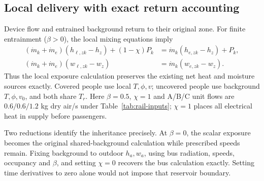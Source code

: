 \subsection{Local delivery with exact return accounting}
Device flow and entrained background return to their original zone. For finite entrainment ($\beta>0$), the local mixing equations imply
\begin{align}
 (\dot m_k+\dot m_e)(h_{\ell,zk}-h_z)+(1-\chi)P_k
 &=\dot m_k(h_{e,zk}-h_z)+P_k,\\
 (\dot m_k+\dot m_e)(w_{\ell,zk}-w_z)
 &=\dot m_k(w_{e,zk}-w_z).
\label{eq:return-closure}
\end{align}
Thus the local exposure calculation preserves the existing net heat and moisture sources exactly. Covered people use local $T,\phi,v$; uncovered people use background $T,\phi,v_0$, and both share $T_r$. Here $\beta=0.5$, $\chi=1$ and A/B/C unit flows are $0.6/0.6/1.2$ kg dry air/s under Table~\ref{tab:rail-inputs}; $\chi=1$ places all electrical heat in supply before passengers.

Two reductions identify the inheritance precisely. At $\beta=0$, the scalar exposure becomes the original shared-background calculation while prescribed speeds remain. Fixing background to outdoor $h_a,w_a$, using bus radiation, speeds, occupancy and $\beta$, and setting $\chi=0$ recovers the bus calculation exactly. Setting time derivatives to zero alone would not impose that reservoir boundary.

